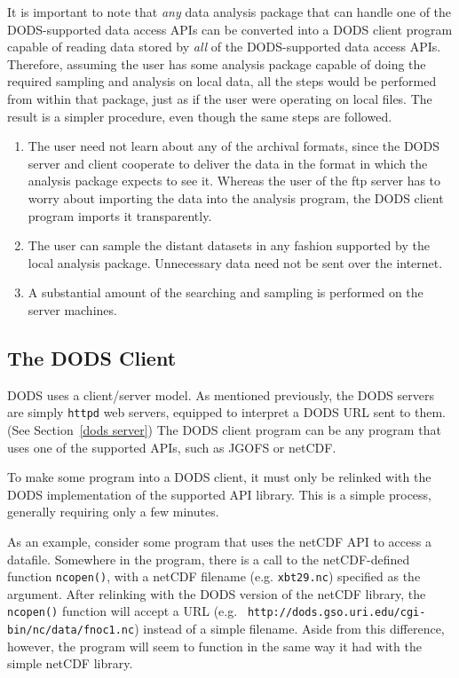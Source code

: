 It is important to note that {\em any} data analysis package that can
handle one of the DODS-supported data access APIs can be converted
into a DODS client program capable of reading data stored by {\em all}
of the DODS-supported data access APIs. Therefore, assuming the user
has some analysis package capable of doing the required sampling and
analysis on local data, all the steps would be performed from within
that package, just as if the user were operating on local files. The
result is a simpler procedure, even though the same steps are
followed.

\begin{enumerate}

\item The user need not learn about any of the archival formats, since
the DODS server and client cooperate to deliver the data in the format
in which the analysis package expects to see it. Whereas the user of
the ftp server has to worry about importing the data into the analysis
program, the DODS client program imports it transparently.

\item The user can sample the distant datasets in any fashion supported
by the local analysis package. Unnecessary data need not be sent over
the internet.

\item A substantial amount of the searching and sampling is performed
on the server machines.

\end{enumerate}

\subsection{The DODS Client}
\label{dods client}

DODS uses a client/server model. As mentioned previously, the DODS
servers are simply {\tt httpd} web servers, equipped to interpret a
DODS URL sent to them. (See Section~\ref{dods server}) The DODS client
program can be any program that uses one of the supported APIs, such
as JGOFS or netCDF.

To make some program into a DODS client, it must only be relinked with
the DODS implementation of the supported API library. This is a simple
process, generally requiring only a few minutes.

As an example, consider some program that uses the netCDF API to
access a datafile. Somewhere in the program, there is a call to the
netCDF-defined function {\tt ncopen()}, with a netCDF filename
(e.g. {\tt xbt29.nc}) specified as the argument. After relinking with
the DODS version of the netCDF library, the {\tt ncopen()} function
will accept a URL (e.g. {\tt
http://dods.gso.uri.edu/cgi-bin/nc/data/fnoc1.nc}) instead of a simple
filename. Aside from this difference, however, the program will seem
to function in the same way it had with the simple netCDF library.

